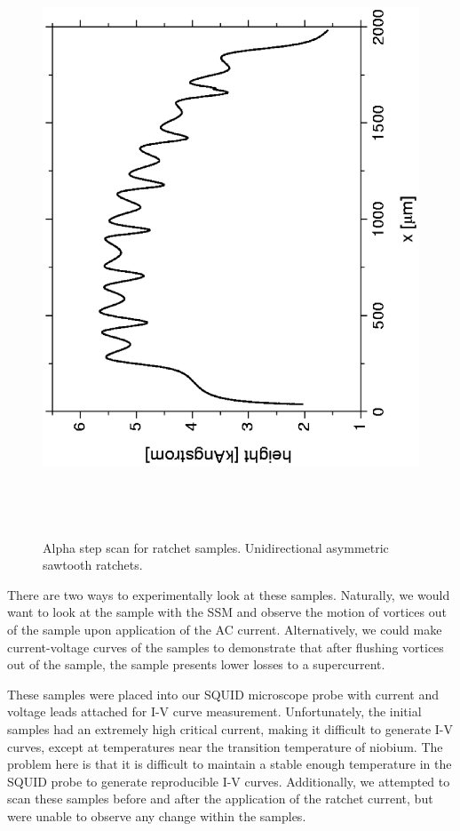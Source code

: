 \begin{figure}[p]
\includegraphics[height=7.0in]{figs/prospective/fig3_b_lg.ps}
\caption{Alpha step scan for ratchet samples.  
Unidirectional asymmetric sawtooth ratchets.}
\label{fig:ratchet_alpha_step_b}
\end{figure}

There are two ways to experimentally look at these samples. Naturally, 
we would want to look at the sample with the SSM and observe the motion
of vortices out of the sample upon application of the AC current. 
Alternatively, we could make current-voltage curves of the samples to 
demonstrate that after flushing vortices out of the sample, the sample
presents lower losses to a supercurrent. 

These samples were placed into our SQUID microscope probe with current
and voltage leads attached for I-V curve measurement. Unfortunately, 
the initial samples had an extremely high critical current, making it
difficult to generate I-V curves, except at temperatures near the
transition temperature of niobium. The problem here is that 
it is difficult to maintain a stable enough temperature in the SQUID probe
to generate reproducible I-V curves. 
Additionally, we attempted to scan these samples before and after
the application of the ratchet current, but were unable to observe
any change within the  samples. 


